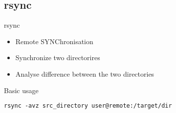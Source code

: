 \subsection{rsync}

\begin{frame}[fragile]{rsync}
  \begin{itemize}
    \pause \item Remote SYNChronisation
    \pause \item Synchronize two directorires
    \pause \item Analyse difference between the two directories
  \end{itemize}
  \pause

  \begin{exampleblock}{Basic usage}
    \begin{lstlisting}[showstringspaces=false,basicstyle=\tiny]
rsync -avz src_directory user@remote:/target/dir
    \end{lstlisting}
  \end{exampleblock}
\end{frame}
